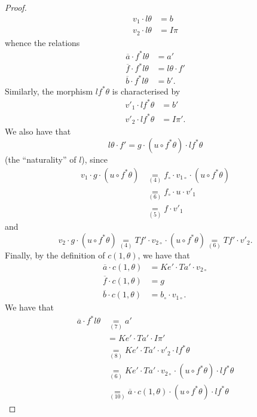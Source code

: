 \documentclass[fleqn]{article}
\newcommand{\oldpage}[1]{\marginpar{\footnotesize$\Big\vert$ \textit{p.~#1}}}
\begin{document}
\begin{proof}
\[\begin{aligned}
      v_1\cdot l\theta
      &= b
    \\v_2\cdot l\theta
      &= I\pi
    \end{aligned}
  \]
  whence the relations
  \[
    \begin{aligned}
      \overline{a}\cdot f^*l\theta
      &= a'
    \\\overline{f}\cdot f^*l\theta
      &= l\theta\cdot f'
    \\\overline{b}\cdot f^*l\theta
      &= b'.
    \end{aligned}
    \tag{7}
  \]
  \oldpage{265}
  Similarly, the morphism $lf^*\theta$ is characterised by
  \[
    \begin{aligned}
      v'_1\cdot lf^*\theta
      &= b'
    \\v'_2\cdot lf^*\theta
      &= I\pi'.
    \end{aligned}
    \tag{8}
  \]
  We also have that
  \[
    l\theta\cdot f'
    = g\cdot(u\circ f^*\theta)\cdot lf^*\theta
    \tag{9}
  \]
  (the ``naturality'' of $l$), since
  \[
    \begin{aligned}
      v_1\cdot g\cdot(u\circ f^*\theta)
      &\underset{(4)}{=} f_\circ\cdot v_{1\circ}\cdot(u\circ f^*\theta)
    \\&\underset{(6)}{=} f_\circ\cdot u\cdot v'_1
    \\&\underset{(5)}{=} f\cdot v'_1
    \end{aligned}
  \]
  and
  \[
    v_2\cdot g\cdot(u\circ f^*\theta)
    \underset{(4)}{=} Tf'\cdot v_{2\circ}\cdot(u\circ f^*\theta)
    \underset{(6)}{=} Tf'\cdot v'_2.
  \]
  Finally, by the definition of $c(1,\theta)$, we have that
  \[
    \begin{aligned}
      \overline{a}\cdot c(1,\theta)
      &= Ke'\cdot Ta'\cdot v_{2\circ}
    \\\overline{f}\cdot c(1,\theta)
      &= g
    \\\overline{b}\cdot c(1,\theta)
      &= b_\circ\cdot v_{1\circ}.
    \end{aligned}
    \tag{10}
  \]
  We have that
  \[
    \begin{aligned}
      \overline{a}\cdot f^*l\theta
      &\underset{(7)}{=} a'
    \\&= Ke'\cdot Ta'\cdot I\pi'
    \\&\underset{(8)}{=} Ke'\cdot Ta'\cdot v'_2\cdot lf^*\theta
    \\&\underset{(6)}{=} Ke'\cdot Ta'\cdot v_{2\circ}\cdot(u\circ f^*\theta)\cdot lf^*\theta
    \\&\underset{(10)}{=} \overline{a}\cdot c(1,\theta)\cdot(u\circ f^*\theta)\cdot lf^*\theta

\end{aligned}\]
\end{proof}
\end{document}
